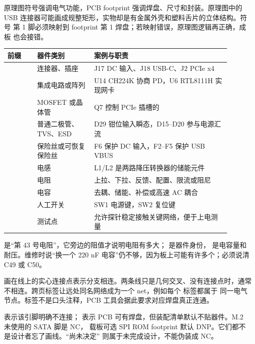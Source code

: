 %
原理图符号强调电气功能，PCB footprint 强调焊盘、尺寸和封装。原理图中的
USB 连接器可能画成规整矩形，实物却是有金属外壳和塑料舌片的立体结构。符号
第 1 脚必须映射到 footprint 第 1 焊盘；若映射错误，原理图逻辑再正确，成板
也会接错。

%

\begin{longtable}{L{0.12\linewidth}L{0.23\linewidth}L{0.55\linewidth}}
\toprule
前缀 & 器件类别 & 案例与职责 \\
\midrule
{} & 连接器、插座 & J17 DC 输入、J18 USB-C、J2 PCIe x4 \\
 & 集成电路或阵列 & U14 CH224K 协商 PD，U6 RTL8111H 实现网卡 \\
 & MOSFET 或晶体管 & Q7 控制 PCIe 插槽的  \\
 & 普通二极管、TVS、ESD & D29 钳位输入瞬态，D15--D20 参与电源汇流 \\
 & 保险丝或可恢复保险丝 & F6 保护 DC 输入，F2--F5 保护 USB VBUS \\
 & 电感 & L1/L2 是两路降压转换器的储能元件 \\
 & 电阻 & 上拉、下拉、反馈、配置、限流或阻尼 \\
 & 电容 & 去耦、储能、补偿或高速 AC 耦合 \\
 & 人工开关 & SW1 电源键，SW2 复位键 \\
 & 测试点 & 允许探针稳定接触关键网络，便于上电测量 \\
\bottomrule
\end{longtable}

%
 是“第 43 号电阻”，它旁边的阻值才说明电阻有多大；
 是器件身份， 是电容量和耐压。维修时说“换一个
220 nF 电容”仍不够，因为板上可能有许多个；必须说清 C49 或 C50。

%
画在线上的实心连接点表示分支相连。两条线只是几何交叉、没有连接点时，通常
不相连。跨页标签让远处同名网络成为一个 net，例如每个  标签都属于
同一电气节点。标签不是口头注释，PCB 工具会据此要求对应焊盘真正连通。

%
表示该引脚明确不连接；
表示 PCB 可有焊盘，但装配清单默认不贴器件。M.2 未使用的 SATA 脚是 NC，
载板可选 SPI ROM footprint 默认 DNP。它们都不是设计者忘了画线。“尚未决定”
则属于未完成设计，不能伪装成 NC。

